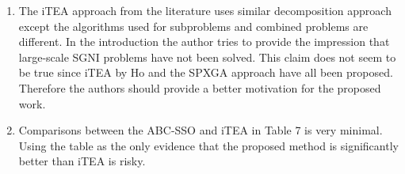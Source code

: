 \documentclass[12pt]{article}
\begin{document}
\begin{CJK}{UTF8}{bkai}
\begin{enumerate}
\item The iTEA approach from the literature uses similar decomposition approach except the algorithms used for subproblems and combined problems are different. In the introduction the author tries to provide the impression that large-scale SGNI problems have not been solved. This claim does not seem to be true since iTEA by Ho and the SPXGA approach have all been proposed. Therefore the authors should provide a better motivation for the proposed work.

\item Comparisons between the ABC-SSO and iTEA in Table 7 is very minimal. Using the table as the only evidence that the proposed method is significantly better than iTEA is risky.

\end{enumerate}
\end{CJK}
\end{document}
